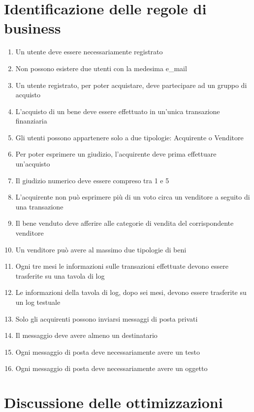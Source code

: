\documentclass[a4paper, 10pt]{report}
\begin{document}
\chapter{Identificazione delle regole di business}
\begin{enumerate}
\item Un utente deve essere necessariamente registrato
\item Non possono esistere due utenti con la medesima e\_mail
\item Un utente registrato, per poter acquistare, deve partecipare ad un gruppo di acquisto
\item L'acquisto di un bene deve essere effettuato in un'unica transazione finanziaria
\item Gli utenti possono appartenere solo a due tipologie: Acquirente o Venditore
\item Per poter esprimere un giudizio, l'acquirente deve prima effettuare un'acquisto
\item Il giudizio numerico deve essere compreso tra 1 e 5
\item L'acquirente non pu\`o esprimere pi\`u di un voto circa un venditore a seguito di una transazione
\item Il bene venduto deve afferire alle categorie di vendita del corrispondente venditore
\item Un venditore pu\`o avere al massimo due tipologie di beni
\item Ogni tre mesi le informazioni sulle transazioni effettuate devono essere trasferite su una tavola di log
\item Le informazioni della tavola di log, dopo sei mesi, devono essere trasferite su un log testuale
\item Solo gli acquirenti possono inviarsi messaggi di posta privati
\item Il messaggio deve avere almeno un destinatario
\item Ogni messaggio di posta deve necessariamente avere un testo
\item Ogni messaggio di posta deve necessariamente avere un oggetto
\end{enumerate}
\chapter{Discussione delle ottimizzazioni}
\end{document}
